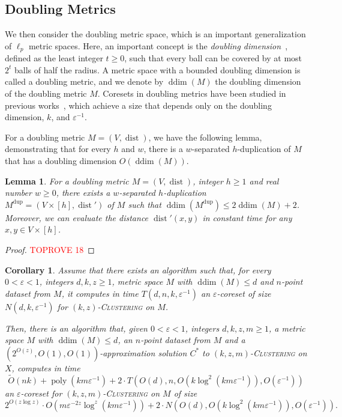 \documentclass[letterpaper,11pt]{article}
\theoremstyle{plain}
\newtheorem{lemma}[theorem]{Lemma}
\newtheorem{corollary}[theorem]{Corollary}
\theoremstyle{definition}
\theoremstyle{remark}
\DeclareMathOperator{\poly}{poly}
\DeclareMathOperator{\ddim}{ddim}
\DeclareMathOperator{\dist}{dist}
\newcommand{\dup}{\mathrm{dup}}
\newcommand{\eps}{\varepsilon}
\newcommand{\ProblemName}[1]{\textsc{#1}}
\newcommand{\kzC}{\ProblemName{$(k,z)$-Clustering}\xspace}
\newcommand{\kzmC}{\ProblemName{$(k,z,m)$-Clustering}\xspace}
\begin{document}
\begin{appendices}
\subsection{Doubling Metrics}
We then consider the doubling metric space, which is an important generalization of $\ell_p$ metric spaces. Here, an important concept is the \emph{doubling dimension}~\cite{DBLP:conf/focs/GuptaKL03}, defined as the least integer $t\ge 0$, such that every ball can be covered by at most $2^t$ balls of half the radius. A metric space with a bounded doubling dimension is called a doubling metric, and we denote by $\ddim(M)$ the doubling dimension of the doubling metric $M$.
Coresets in doubling metrics have been studied in previous works~\cite{DBLP:conf/focs/HuangJLW18,Cohen-addad2021New}, which achieve a size that depends only on the doubling dimension, $k$, and $\eps^{-1}$.

For a doubling metric $M=(V,\dist)$, we have the following lemma, demonstrating that for every $h$ and $w$, there is a $w$-separated $h$-duplication of $M$ that has a doubling dimension $O(\ddim(M))$.


\begin{lemma}
    \label{lem:duplication doubling}
    For a doubling metric $M=(V,\dist)$, integer $h\ge 1$ and real number $w\ge 0$, there exists a $w$-separated $h$-duplication $M^\dup=(V\times [h],\dist')$ of $M$ such that $\ddim(M^\dup) \le 2\ddim(M) + 2$. Moreover, we can evaluate the distance $\dist'(x,y)$ in constant time for any $x,y\in V\times [h]$.
\end{lemma}
\begin{proof}\textcolor{red}{TOPROVE 18}\end{proof}





\begin{corollary}
    \label{cor:doubline}
    Assume that there exists an algorithm such that, for every $0<\eps<1$, integers $d,k,z\ge 1$, metric space $M$ with $\ddim(M)\le d$ and $n$-point dataset from $M$, it computes in time $T(d,n,k,\eps^{-1})$ an $\eps$-coreset of size $N(d,k,\eps^{-1})$ for \kzC on $M$.
    
    Then, there is an algorithm that, given $0<\eps<1$, integers $d,k,z,m\ge 1$, a metric space $M$ with $\ddim(M)\le d$, an $n$-point dataset from $M$ and a $(2^{O(z)},O(1),O(1))$-approximation solution $C^*$ to \kzmC on $X$, computes in time 
    \begin{equation*}
        \tilde O(nk) + \poly(km\eps^{-1}) + 2\cdot T(O(d),n,O(k\log^2(km\eps^{-1})),O(\eps^{-1}))
    \end{equation*}
    an $\eps$-coreset for \kzmC on $M$ of size 
    \begin{equation*}
        2^{O(z\log z)}\cdot O\left(m\eps^{-2z}\log^z(km\eps^{-1})\right) + 2\cdot N\left(O(d), O(k\log^2(km\eps^{-1})), O(\eps^{-1})\right).
    \end{equation*}
\end{corollary}


\end{appendices}
\end{document}
